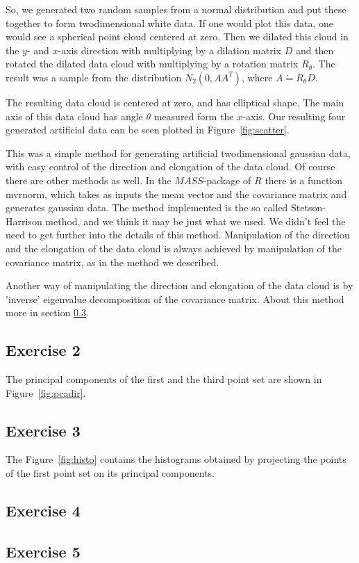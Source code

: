 \documentclass{article}
\begin{document}
So, we generated two random samples from a normal distribution and put these
together to form twodimensional white data. If one would plot this
data, one would see a spherical point cloud centered at zero. Then we
dilated this cloud in the $y$- and $x$-axis direction with multiplying by a dilation matrix $D$ and then rotated
the dilated data cloud with multiplying by a rotation matrix
$R_\theta$. The result was a sample from the 
distribution $N_2(0,AA^T)$, where $A \dot{=} R_\theta D$.

The resulting data cloud is centered at zero, and has elliptical
shape. The main axis of this data cloud has angle $\theta$ measured
form the $x$-axis. Our resulting four generated artificial data can be
seen plotted in Figure~\ref{fig:scatter}. 

This was a simple method for generating artificial twodimensional
gaussian data, with easy control of the direction and elongation of
the data cloud. Of course there are other methods as well. In the
$MASS$-package of $R$ there is a function mvrnorm, which takes as
inputs the mean vector and the covariance matrix and generates
gaussian data. The method implemented is the so called
Stetson-Harrison method, and we think it may be just what we used. We
didn't feel the need to get further into the details of this
method. Manipulation of the direction and the elongation of the data
cloud is always achieved by manipulation of the covariance matrix, as
in the method we described.

Another way of manipulating the direction and elongation of the data
cloud is by 'inverse' eigenvalue decomposition of the covariance
matrix. About this method more in section \ref{sec:subsection4}.
\subsection{Exercise 2}
The principal components of the first and the third point set are shown in Figure~\ref{fig:pcadir}.
\subsection{Exercise 3}
The Figure~\ref{fig:histo} contains the histograms obtained by projecting the points of the first point set on its principal components.
\subsection{Exercise 4}\label{sec:subsection4}
\subsection{Exercise 5}
\end{document}
